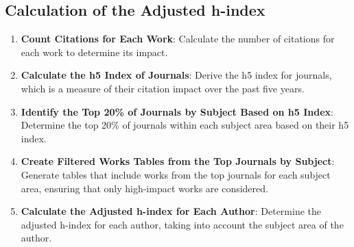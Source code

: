 \subsection{Calculation of the Adjusted h-index}

\begin{enumerate}
      \item \textbf{Count Citations for Each Work}: Calculate the number of citations for each work to determine its impact.

      \item \textbf{Calculate the h5 Index of Journals}: Derive the h5 index for journals, which is a
            measure of their citation impact over the past five years.

      \item \textbf{Identify the Top 20\% of Journals by Subject Based on h5 Index}: Determine the top 20\% of journals within
            each subject area based on their h5 index.

      \item \textbf{Create Filtered Works Tables from the Top Journals by Subject}: Generate tables that include works from the
            top journals for each subject area, ensuring that only high-impact works are considered.

      \item \textbf{Calculate the Adjusted h-index for Each Author}: Determine the adjusted h-index for each author,
            taking into account the subject area of the author.
\end{enumerate}

